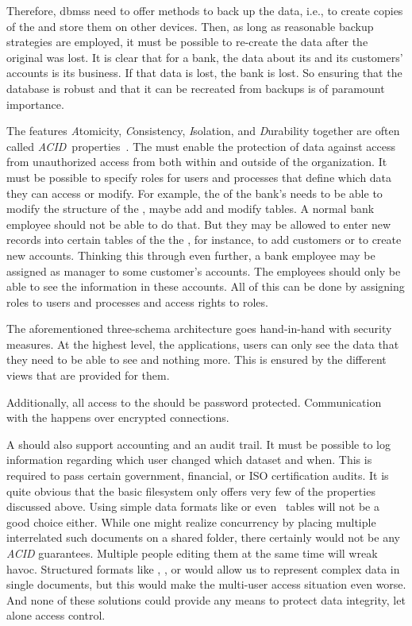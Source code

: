 Therefore, \glspl{dbms} need to offer methods to back up the data, i.e., to create copies of the  and store them on other devices.
Then, as long as reasonable backup strategies are employed, it must be possible to re-create the data after the original  was lost.
It is clear that for a bank, the data about its and its customers' accounts is its business.
If that data is lost, the bank is lost.
So ensuring that the database is robust and that it can be recreated from backups is of paramount importance.%
\endhsection%

The features \emph{A}tomicity, \emph{C}onsistency, \emph{I}solation, and \emph{D}urability together are often called \emph{ACID}~properties~\cite{GR1992TPCAT,WV2001TISTAATPOCCAR}.
%
\label{sec:featuresDataPrivacyAndSecurity}%
The  must enable the protection of data against access from unauthorized access from both within and outside of the organization.
It must be possible to specify roles for users and processes that define which data they can access or modify.
For example, the  of the bank's  needs to be able to modify the structure of the , maybe add and modify tables.
A normal bank employee should not be able to do that.
But they may be allowed to enter new records into certain tables of the the , for instance, to add customers or to create new accounts.
Thinking this through even further, a bank employee may be assigned as manager to some customer's accounts.
The employees should only be able to see the information in these accounts.
All of this can be done by assigning roles to users and processes and access rights to roles.

The aforementioned three-schema architecture goes hand-in-hand with security measures.
At the highest level, the applications, users can only see the data that they need to be able to see and nothing more.
This is ensured by the different views that are provided for them.

Additionally, all access to the  should be password protected.
Communication with the  happens over encrypted connections.

A  should also support accounting and an audit trail.
It must be possible to log information regarding which user changed which dataset and when.
This is required to pass certain government, financial, or ISO certification audits.
\endhsection%
%
%
It is quite obvious that the basic filesystem only offers very few of the properties discussed above.
Using simple data formats like  or even \microsoftExcel\ tables will not be a good choice either.
While one might realize concurrency by placing multiple interrelated such documents on a shared folder, there certainly would not be any \emph{ACID} guarantees.
Multiple people editing them at the same time will wreak havoc.
Structured formats like , , or  would allow us to represent complex data in single documents, but this would make the multi-user access situation even worse.
And none of these solutions could provide any means to protect data integrity, let alone access control.

